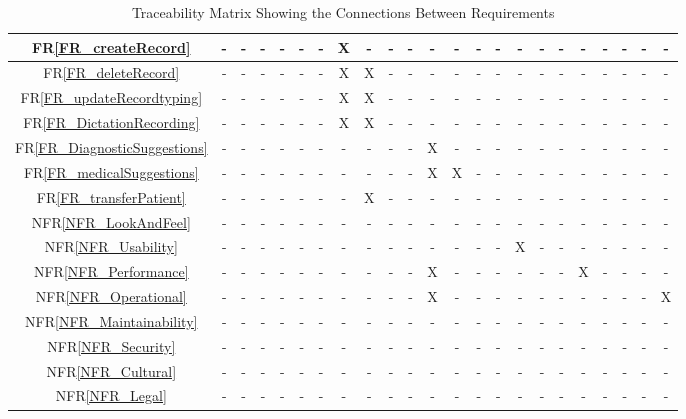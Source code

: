 \documentclass[12pt]{article}
\begin{document}
\begin{landscape}
\begin{table}[H]
\begin{tabular}{|c|c|c|c|c|c|c|c|c|c|c|c|c|c|c|c|c|c|c|c|c|c|c|}
      FR\ref{FR_createRecord} & - & - & - & - & - & - & X & - & - & - & - & - & - & - & - & - & - & - & - & - & - & - \\ \hline
      FR\ref{FR_deleteRecord} & - & - & - & - & - & - & X & X & - & - & - & - & - & - & - & - & - & - & - & - & - & - \\ \hline
      FR\ref{FR_updateRecordtyping} & - & - & - & - & - & - & X & X & - & - & - & - & - & - & - & - & - & - & - & - & - & - \\ \hline
      FR\ref{FR_DictationRecording} & - & - & - & - & - & - & X & X & - & - & - & - & - & - & - & - & - & - & - & - & - & - \\ \hline
      FR\ref{FR_DiagnosticSuggestions} & - & - & - & - & - & - & - & - & - & - & X & - & - & - & - & - & - & - & - & - & - & - \\ \hline
      FR\ref{FR_medicalSuggestions} & - & - & - & - & - & - & - & - & - & - & X & X & - & - & - & - & - & - & - & - & - & - \\ \hline
      FR\ref{FR_transferPatient} & - & - & - & - & - & - & - & X & - & - & - & - & - & - & - & - & - & - & - & - & - & - \\ \hline
      NFR\ref{NFR_LookAndFeel} & - & - & - & - & - & - & - & - & - & - & - & - & - & - & - & - & - & - & - & - & - & - \\ \hline
      NFR\ref{NFR_Usability} & - & - & - & - & - & - & - & - & - & - & - & - & - & - & X & - & - & - & - & - & - & - \\ \hline
      NFR\ref{NFR_Performance} & - & - & - & - & - & - & - & - & - & - & X & - & - & - & - & - & - & X & - & - & - & - \\ \hline
      NFR\ref{NFR_Operational} & - & - & - & - & - & - & - & - & - & - & X & - & - & - & - & - & - & - & - & - & - & X \\ \hline
      NFR\ref{NFR_Maintainability} & - & - & - & - & - & - & - & - & - & - & - & - & - & - & - & - & - & - & - & - & - & - \\ \hline
      NFR\ref{NFR_Security} & - & - & - & - & - & - & - & - & - & - & - & - & - & - & - & - & - & - & - & - & - & - \\ \hline
      NFR\ref{NFR_Cultural} & - & - & - & - & - & - & - & - & - & - & - & - & - & - & - & - & - & - & - & - & - & - \\ \hline
      NFR\ref{NFR_Legal} & - & - & - & - & - & - & - & - & - & - & - & - & - & - & - & - & - & - & - & - & - & - \\ \hline
      \end{tabular}
      \caption{Traceability Matrix Showing the Connections Between Requirements}
      \label{Table:A_trace}
      \end{table}
    \end{landscape}
\end{document}
